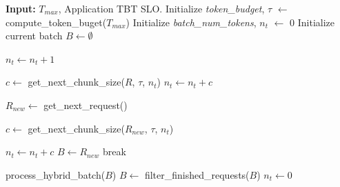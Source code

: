 \algrenewcommand\algorithmicindent{1em}
\begin{algorithm}[t!]
\caption{\Hbatch with \sysname.  First the batch is filled with with ongoing decode tokens (lines 6-8) and optionally one prefill chunk from ongoing (lines 10-12). Finally, new requests are added (lines 13-20) within the token budget so as to maximize throughput with minimal latency impact on the TBT of delaying the ongoing decodes.}
\label{alg:stall_free}
\begin{algorithmic}[1]
\State \textbf{Input:} $T_{max}$, Application TBT SLO.
\State Initialize \textit{token\_budget}, $\tau$ $\leftarrow$ compute\_token\_buget($T_{max}$)
\State Initialize \textit{batch\_num\_tokens}, $n_t$ $\leftarrow$ 0
\State Initialize current batch $B \leftarrow \emptyset$

            \State $n_t \leftarrow n_t + 1$
        \EndIf
    \EndFor
    
            \State $c \leftarrow$  get\_next\_chunk\_size($R$, $\tau$, $n_t$)
            \State $n_t \leftarrow n_t + c$
        \EndIf
    \EndFor
    
    \State $R_{new} \leftarrow$ get\_next\_request()

        \State $ c \leftarrow$  get\_next\_chunk\_size($R_{new}$, $\tau$, $n_t$)
        
            \State $n_t \leftarrow n_t + c$
            \State $B \leftarrow R_{new}$ 
        \Else
            \State break
        \EndIf
    \EndWhile

    \State
    \State process\_hybrid\_batch($B$)
    \State $B \leftarrow$ filter\_finished\_requests($B$)
    \State $n_t \leftarrow 0$
\EndWhile
\end{algorithmic}
\end{algorithm}
